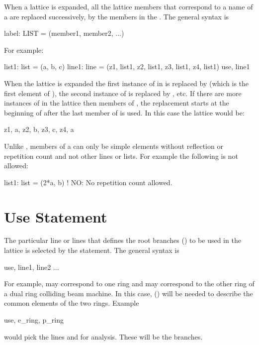 When a lattice is expanded, all the lattice members that correspond to
a name of a  are replaced successively, by the
members in the . The general syntax is
\begin{example}
  label: LIST = (member1, member2, ...)
\end{example}
For example:
\begin{example}
  list1: list = (a, b, c)
  line1: line = (z1, list1, z2, list1, z3, list1, z4, list1)
  use, line1
\end{example}
When the lattice is expanded the first instance of  in
 is replaced by  (which is the first element of
), the second instance of  is replaced by ,
etc. If there are more instances of  in the lattice then
members of , the replacement starts at the beginning of
 after the last member of  is used. In this case the
lattice would be:
\begin{example}
  z1, a, z2, b, z3, c, z4, a
\end{example}
Unlike \mad, members of a  can only be simple elements 
without reflection or repetition count and not other lines or lists. 
For example the following is not allowed:
\begin{example}
  list1: list = (2*a, b)  ! NO: No repetition count allowed.
\end{example}

\section{Use Statement}
\label{s:use}

The particular line or lines that defines the root branches
() to be used in the lattice is selected by the
 statement. The general syntax is
\begin{example}
  use, line1, line2 ...
\end{example}
For example,  may correspond to one ring and  may
correspond to the other ring of a dual ring colliding beam machine. In
this case,  () will be needed to
describe the common elements of the two rings. Example
\begin{example}
  use, e_ring, p_ring
\end{example}
would pick the lines  and  for analysis. 
These will be the  branches.

